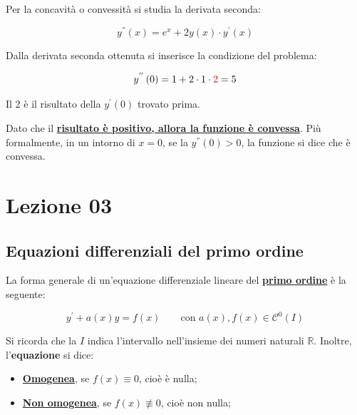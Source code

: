 \documentclass[a4paper]{article}
\begin{document}
	\noindent
	Per la concavità o convessità si studia la derivata seconda:
	
	\begin{equation*}
		y^{''}\left(x\right) = e^{x} + 2y\left(x\right) \cdot y^{'}\left(x\right)
	\end{equation*}

	\noindent
	Dalla derivata seconda ottenuta si inserisce la condizione del problema:
	
	\begin{equation*}
		y^{''}\left(0\right) = 1 + 2 \cdot 1 \cdot \textcolor{Red3}{2} = 5
	\end{equation*}

	\noindent
	Il \textcolor{Red3}{2} è il risultato della $y^{'}\left(0\right)$ trovato prima.
	
	Dato che il \textbf{\underline{risultato è positivo, allora la funzione è convessa}}. Più formalmente, in un intorno di $x = 0$, se la $y^{''}\left(0\right) > 0$, la funzione si dice che è convessa.
	
	\section{Lezione 03}
	
	\subsection{Equazioni differenziali del primo ordine}
	
	La forma generale di un'equazione differenziale lineare del \textbf{\underline{primo ordine}} è la seguente:
	
	\begin{equation*}
		y^{'} + a\left(x\right) y = f\left(x\right) \hspace{2em} \text{con } a\left(x\right), f\left(x\right) \in \mathcal{C}^{0}\left(I\right)
	\end{equation*}

	\noindent
	Si ricorda che la $I$ indica l'intervallo nell'insieme dei numeri naturali $\mathbb{R}$. Inoltre, l'\textbf{equazione} si dice:
	
	\begin{itemize}
		\item \textcolor{Red3}{\textbf{\underline{Omogenea}}}, se $f\left(x\right) \equiv 0$, cioè è nulla;
		\item \textcolor{Red3}{\textbf{\underline{Non omogenea}}}, se $f\left(x\right) \not\equiv 0$, cioè non nulla;
	\end{itemize}
\end{document}
